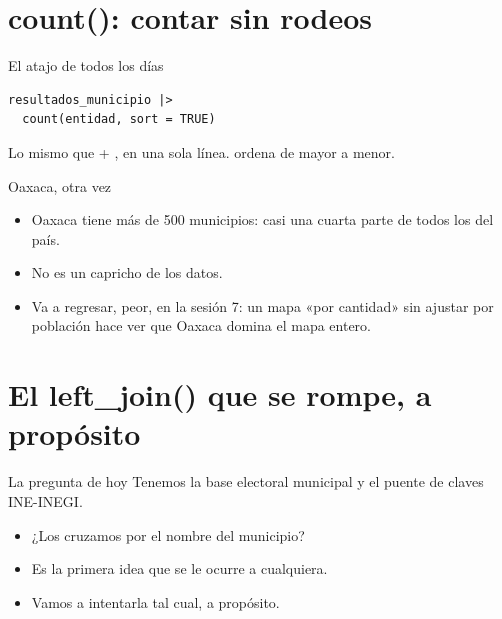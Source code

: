 \section{count(): contar sin rodeos}

\begin{frame}[fragile]{El atajo de todos los días}
\begin{lstlisting}
resultados_municipio |>
  count(entidad, sort = TRUE)
\end{lstlisting}

  \vspace{0.7em}
  Lo mismo que  + , en una sola
  línea.  ordena de mayor a menor.
\end{frame}

\begin{frame}{Oaxaca, otra vez}
  \vspace{0.4em}
  \begin{itemize}\setlength{\itemsep}{0.9em}
    \item<1-> Oaxaca tiene más de 500 municipios: casi una cuarta parte de
          todos los del país.
    \item<2-> No es un capricho de los datos.
    \item<3-> Va a regresar, peor, en la sesión 7: un mapa «por cantidad»
          sin ajustar por población hace ver que Oaxaca domina el mapa
          entero.
  \end{itemize}
\end{frame}

\section{El left\_join() que se rompe, a propósito}

\begin{frame}{La pregunta de hoy}
  \vspace{0.3em}
  Tenemos la base electoral municipal y el puente de claves INE-INEGI.

  \vspace{0.9em}
  \begin{itemize}\setlength{\itemsep}{0.9em}
    \item<1-> ¿Los cruzamos por el \ac{nombre} del municipio?
    \item<2-> Es la primera idea que se le ocurre a cualquiera.
    \item<3-> Vamos a intentarla tal cual, a propósito.
  \end{itemize}
\end{frame}

